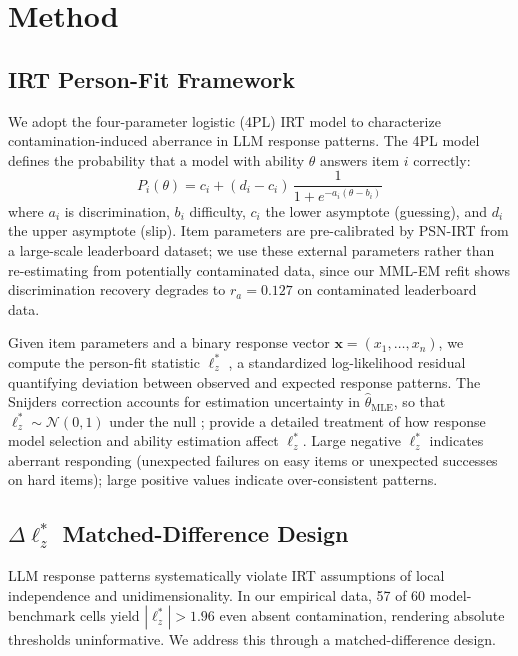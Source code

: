 \section{Method}
\label{sec:method}

\subsection{IRT Person-Fit Framework}
\label{sec:framework}

We adopt the four-parameter logistic (4PL) IRT model to characterize contamination-induced aberrance in LLM response patterns.
The 4PL model defines the probability that a model with ability $\theta$ answers item $i$ correctly:
\begin{equation}
  P_i(\theta) = c_i + (d_i - c_i)\,\frac{1}{1 + e^{-a_i(\theta - b_i)}}
  \label{eq:4pl}
\end{equation}
where $a_i$ is discrimination, $b_i$ difficulty, $c_i$ the lower asymptote (guessing), and $d_i$ the upper asymptote (slip).
Item parameters are pre-calibrated by PSN-IRT \citep{psnirt2026} from a large-scale leaderboard dataset; we use these external parameters rather than re-estimating from potentially contaminated data, since our MML-EM refit shows discrimination recovery degrades to $r_a{=}0.127$ on contaminated leaderboard data.

Given item parameters and a binary response vector $\mathbf{x} = (x_1, \ldots, x_n)$, we compute the person-fit statistic $\ell_z^*$ \citep{snijders2001}, a standardized log-likelihood residual quantifying deviation between observed and expected response patterns.
The Snijders correction accounts for estimation uncertainty in $\hat{\theta}_{\text{MLE}}$, so that $\ell_z^* \sim \mathcal{N}(0,1)$ under the null \citep{drasgow1985, snijders2001}; \citet{magis2012} provide a detailed treatment of how response model selection and ability estimation affect $\ell_z^*$.
Large negative $\ell_z^*$ indicates aberrant responding (unexpected failures on easy items or unexpected successes on hard items); large positive values indicate over-consistent patterns.

\subsection{$\Delta\ell_z^*$ Matched-Difference Design}
\label{sec:did}

LLM response patterns systematically violate IRT assumptions of local independence and unidimensionality.
In our empirical data, 57 of 60 model-benchmark cells yield $|\ell_z^*| > 1.96$ even absent contamination, rendering absolute thresholds uninformative.
We address this through a matched-difference design.

